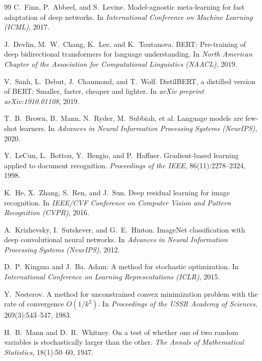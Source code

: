 \documentclass[12pt,a4paper,openany]{report}
\begin{document}
\begin{thebibliography}{99}
 C.~Finn, P.~Abbeel, and S.~Levine. Model-agnostic meta-learning for fast adaptation of deep networks. In \textit{International Conference on Machine Learning (ICML)}, 2017.


 J.~Devlin, M.~W.~Chang, K.~Lee, and K.~Toutanova. BERT: Pre-training of deep bidirectional transformers for language understanding. In \textit{North American Chapter of the Association for Computational Linguistics (NAACL)}, 2019.

 V.~Sanh, L.~Debut, J.~Chaumond, and T.~Wolf. DistilBERT, a distilled version of BERT: Smaller, faster, cheaper and lighter. In \textit{arXiv preprint arXiv:1910.01108}, 2019.

 T.~B.~Brown, B.~Mann, N.~Ryder, M.~Subbiah, et al. Language models are few-shot learners. In \textit{Advances in Neural Information Processing Systems (NeurIPS)}, 2020.


 Y.~LeCun, L.~Bottou, Y.~Bengio, and P.~Haffner. Gradient-based learning applied to document recognition. \textit{Proceedings of the IEEE}, 86(11):2278--2324, 1998.

 K.~He, X.~Zhang, S.~Ren, and J.~Sun. Deep residual learning for image recognition. In \textit{IEEE/CVF Conference on Computer Vision and Pattern Recognition (CVPR)}, 2016.

 A.~Krizhevsky, I.~Sutskever, and G.~E.~Hinton. ImageNet classification with deep convolutional neural networks. In \textit{Advances in Neural Information Processing Systems (NeurIPS)}, 2012.


 D.~P.~Kingma and J.~Ba. Adam: A method for stochastic optimization. In \textit{International Conference on Learning Representations (ICLR)}, 2015.

 Y.~Nesterov. A method for unconstrained convex minimization problem with the rate of convergence $O(1/k^2)$. In \textit{Proceedings of the USSR Academy of Sciences}, 269(3):543--547, 1983.


 H.~B.~Mann and D.~R.~Whitney. On a test of whether one of two random variables is stochastically larger than the other. \textit{The Annals of Mathematical Statistics}, 18(1):50--60, 1947.


\end{thebibliography}
\end{document}
